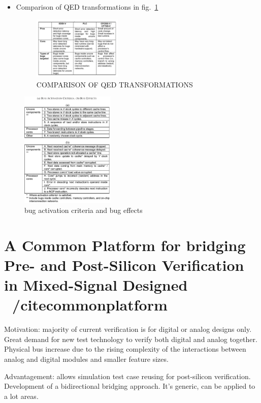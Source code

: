 \documentclass[conference]{IEEEtran}
\begin{document}
\begin{itemize}
\item Comparison of QED transformations in fig.~\ref{comp}
\begin{figure}
 \caption{COMPARISON OF QED TRANSFORMATIONS}
\label{comp}
\centering
    \includegraphics[width=0.4\textwidth]{comp}
\end{figure}
 \end{itemize}

\begin{figure}
\caption{bug activation criteria and bug effects}
\label{fig1}
\centering
    \includegraphics[width=0.4\textwidth]{bug}
\end{figure}



\section{A Common Platform for bridging Pre- and Post-Silicon Verification in Mixed-Signal Designed ~/cite{commonplatform}}
Motivation: majority of current verification is for digital or analog designs only. Great demand for new test technology to verify both digital and analog together. Physical bus increase due to the rising complexity of the interactions between analog and digital modules and smaller feature sizes.

Advantagement: allows simulation test case reusing for post-silicon verification. Development of a bidirectional bridging approach. It's generic, can be applied to a lot areas.
\end{document}
